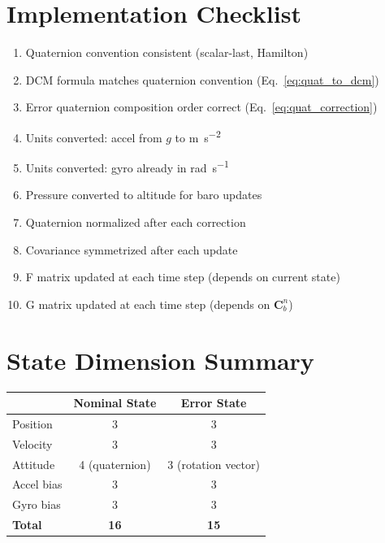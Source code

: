 \documentclass[11pt,a4paper]{article}
\newcommand{\mat}[1]{\mathbf{#1}}
\begin{document}
\section{Implementation Checklist}

\begin{enumerate}
    \item[$\square$] Quaternion convention consistent (scalar-last, Hamilton)
    \item[$\square$] DCM formula matches quaternion convention (Eq.~\ref{eq:quat_to_dcm})
    \item[$\square$] Error quaternion composition order correct (Eq.~\ref{eq:quat_correction})
    \item[$\square$] Units converted: accel from $g$ to \si{\meter\per\second\squared}
    \item[$\square$] Units converted: gyro already in \si{\radian\per\second}
    \item[$\square$] Pressure converted to altitude for baro updates
    \item[$\square$] Quaternion normalized after each correction
    \item[$\square$] Covariance symmetrized after each update
    \item[$\square$] F matrix updated at each time step (depends on current state)
    \item[$\square$] G matrix updated at each time step (depends on $\mat{C}_b^n$)
\end{enumerate}

\section{State Dimension Summary}

\begin{center}
\begin{tabular}{lcc}
    \toprule
    & Nominal State & Error State \\
    \midrule
    Position & 3 & 3 \\
    Velocity & 3 & 3 \\
    Attitude & 4 (quaternion) & 3 (rotation vector) \\
    Accel bias & 3 & 3 \\
    Gyro bias & 3 & 3 \\
    \midrule
    \textbf{Total} & \textbf{16} & \textbf{15} \\
    \bottomrule
\end{tabular}
\end{center}
\end{document}
